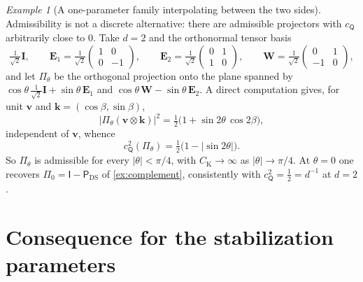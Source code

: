 \documentclass[11pt]{article}
\theoremstyle{plain}
\theoremstyle{definition}
\theoremstyle{remark}
\newtheorem{example}[theorem]{Example}
\newcommand{\IPi}{\mathsf{I}}
\newcommand{\AnyProj}{\mathsf{Q}}
\newcommand{\DSPi}{\mathsf{P}_{\mathrm{DS}}}
\newcommand{\bv}{\boldsymbol{v}}
\newcommand{\bk}{\boldsymbol{k}}
\newcommand{\CK}{C_{\mathrm{K}}}
\newcommand{\cP}{c_{\AnyProj}}
\begin{document}
\begin{example}[A one{-}parameter family interpolating between the two sides]\label{ex:tilted}
Admissibility is not a discrete alternative: there are admissible projectors with $\cP$
arbitrarily close to $0$. Take $d=2$ and the orthonormal tensor basis
\begin{equation}\label{eq:basis2d}
  \tfrac{1}{\sqrt2}\mathbf{I},\qquad
  \mathbf{E}_1=\tfrac{1}{\sqrt2}\begin{pmatrix}1&0\\0&-1\end{pmatrix},\qquad
  \mathbf{E}_2=\tfrac{1}{\sqrt2}\begin{pmatrix}0&1\\1&0\end{pmatrix},\qquad
  \mathbf{W}=\tfrac{1}{\sqrt2}\begin{pmatrix}0&1\\-1&0\end{pmatrix},
\end{equation}
and let $\Pi_\theta$ be the orthogonal projection onto the plane spanned by
$\cos\theta\,\tfrac{1}{\sqrt2}\mathbf{I}+\sin\theta\,\mathbf{E}_1$ and
$\cos\theta\,\mathbf{W}-\sin\theta\,\mathbf{E}_2$. A direct computation gives, for unit
$\bv$ and $\bk=(\cos\beta,\sin\beta)$,
\begin{equation}\label{eq:tilted-quad}
  \bigl|\Pi_\theta(\bv\otimes\bk)\bigr|^2
  = \tfrac12\bigl(1+\sin 2\theta\,\cos 2\beta\bigr),
\end{equation}
independent of $\bv$, whence
\begin{equation}\label{eq:tilted-c}
  \cP^2(\Pi_\theta)=\tfrac12\bigl(1-|\sin 2\theta|\bigr) .
\end{equation}
So $\Pi_\theta$ is admissible for every $|\theta|<\pi/4$, with $\CK\to\infty$ as
$|\theta|\to\pi/4$. At $\theta=0$ one recovers $\Pi_0=\IPi-\DSPi$ of
\cref{ex:complement}, consistently with $\cP^2=\tfrac12=d^{-1}$ at $d=2$.
\end{example}

\section{Consequence for the stabilization parameters}\label{sec:tau}
\end{document}
